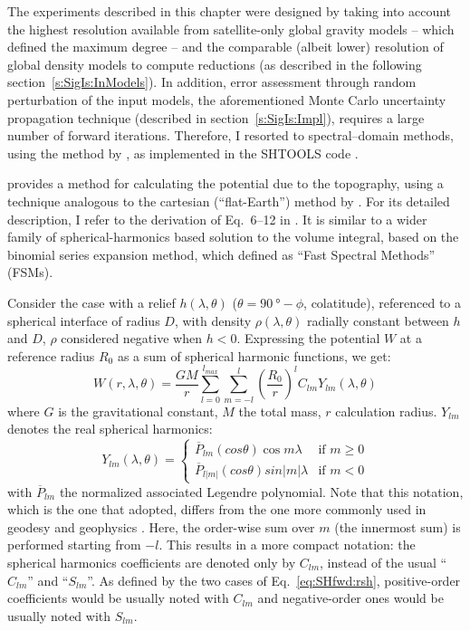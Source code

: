 The experiments described in this chapter were designed by taking into account the highest resolution available from satellite-only global gravity models -- which defined the maximum degree -- and the comparable (albeit lower) resolution of global density models to compute reductions (as described in the following section~\ref{s:SigIs:InModels}).
In addition, error assessment through random perturbation of the input models, the aforementioned Monte Carlo uncertainty propagation technique (described in section~\ref{s:SigIs:Impl}), requires a large number of forward iterations.
Therefore, I resorted to spectral--domain methods, using the method by \textcite{Wieczorek2007}, as implemented in the SHTOOLS code \parencite{Wieczorek2018}.

\Textcite{Wieczorek2007} provides a method for calculating the potential due to the topography, using a technique analogous to the cartesian (``flat-Earth'') method by \textcite{Parker1973}.
For its detailed description, I refer to the derivation of Eq.~6--12 in \textcite{Wieczorek1998}.
It is similar to a wider family of spherical-harmonics based solution to the volume integral, based on the binomial series expansion method, which \textcite{Root2015} defined as ``Fast Spectral Methods'' (FSMs).

Consider the case with a relief $h(\lambda, \theta)$ ($\theta = \SI{90}{\degree} - \phi$, colatitude), referenced to a spherical interface of radius $D$, with density $\rho(\lambda, \theta)$ radially constant between $h$ and $D$, $\rho$ considered negative when $h<0$.
Expressing the potential $W$ at a reference radius $R_0$ as a sum of spherical harmonic functions, we get:
\begin{equation}
    \label{eq:SHfwd:pot}
    W(r, \lambda, \theta) =
    \frac{GM}{r}
    \sum_{l=0}^{l_{max}}
    \sum_{m=-l}^{l}
    \left( \frac{R_0}{r} \right)^l
    C_{lm} Y_{lm} (\lambda, \theta)
\end{equation}
where $G$ is the gravitational constant, $M$ the total mass, $r$ calculation radius.
$Y_{lm}$ denotes the real spherical harmonics:
\begin{equation}
    \label{eq:SHfwd:rsh}
    Y_{lm}(\lambda, \theta) =
    \begin{cases}
        \overline{P}_{lm} (cos \theta) \cos m \lambda & \mbox{if } m \ge 0 \\
        \overline{P}_{l|m|} (cos \theta) sin |m| \lambda & \mbox{if } m < 0
    \end{cases}
\end{equation}
with $\overline{P}_{lm}$ the normalized associated Legendre polynomial.%
Note that this notation, which is the one that \textcite{Wieczorek2007} adopted, differs from the one more commonly used in geodesy and geophysics \parencite[e.g.][]{HofmannWellenhof2006}.
Here, the order-wise sum over $m$ (the innermost sum) is performed starting from $-l$.
This results in a more compact notation: the spherical harmonics coefficients are denoted only by $C_{lm}$, instead of the usual ``$C_{lm}$'' and ``$S_{lm}$''.
As defined by the two cases of Eq.~\ref{eq:SHfwd:rsh}, positive-order coefficients would be usually noted with $C_{lm}$ and negative-order ones would be usually noted with $S_{lm}$.

